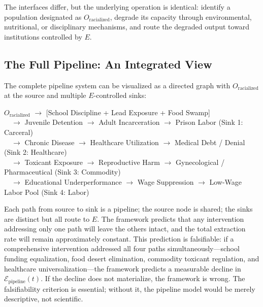 The interfaces differ, but the underlying operation is identical: identify a population designated as $O_{\text{racialized}}$, degrade its capacity through environmental, nutritional, or disciplinary mechanisms, and route the degraded output toward institutions controlled by $E$.

\subsection{The Full Pipeline: An Integrated View}

The complete pipeline system can be visualized as a directed graph with $O_{\text{racialized}}$ at the source and multiple $E$-controlled sinks:

\begin{center}
\begin{tcolorbox}[colback=black!3, colframe=black!70, arc=2pt, boxrule=0.6pt, width=0.95\linewidth]
\small
\ttfamily
$O_{\text{racialized}}$ $\rightarrow$ [School Discipline + Lead Exposure + Food Swamp]
\\[2pt]
$\quad\rightarrow$ Juvenile Detention $\rightarrow$ Adult Incarceration $\rightarrow$ Prison Labor (Sink 1: Carceral)
\\[2pt]
$\quad\rightarrow$ Chronic Disease $\rightarrow$ Healthcare Utilization $\rightarrow$ Medical Debt / Denial (Sink 2: Healthcare)
\\[2pt]
$\quad\rightarrow$ Toxicant Exposure $\rightarrow$ Reproductive Harm $\rightarrow$ Gynecological / Pharmaceutical (Sink 3: Commodity)
\\[2pt]
$\quad\rightarrow$ Educational Underperformance $\rightarrow$ Wage Suppression $\rightarrow$ Low-Wage Labor Pool (Sink 4: Labor)
\end{tcolorbox}
\end{center}

Each path from source to sink is a pipeline; the source node is shared; the sinks are distinct but all route to $E$. The framework predicts that any intervention addressing only one path will leave the others intact, and the total extraction rate will remain approximately constant. This prediction is falsifiable: if a comprehensive intervention addressed all four paths simultaneously---school funding equalization, food desert elimination, commodity toxicant regulation, and healthcare universalization---the framework predicts a measurable decline in $\mathcal{E}_{\text{pipeline}}(t)$. If the decline does not materialize, the framework is wrong. The falsifiability criterion is essential; without it, the pipeline model would be merely descriptive, not scientific.

